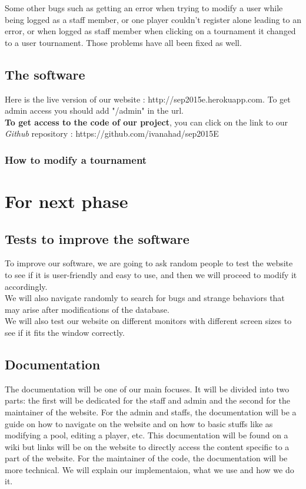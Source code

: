 \documentclass[a4paper, 12pt]{article}
\begin{document}
Some other bugs such as getting an error when trying to modify a user while being logged as a staff member, or one player couldn’t register alone leading to an error, or when logged as staff member when clicking on a tournament it changed to a user tournament. Those problems have all been fixed as well.

\subsection{The software}


Here is the live version of our website : http://sep2015e.herokuapp.com.  To get admin access you should add "/admin" in the url.\\

\textbf{To get access to the code of our project}, you can click on the link to our \textit{Github} repository : https://github.com/ivanahad/sep2015E\\
\subsubsection*{How to modify a tournament}

\section{For next phase}
\subsection{Tests to improve the software}
To improve our software, we are going to ask random people to test the website to see if it is user-friendly and easy to use, and then we will proceed to modify it accordingly.\\

We will also navigate randomly to search for bugs and strange behaviors that may arise after modifications of the database.\\
 
We will also test our website on different monitors with different screen sizes to see if it fits the window correctly.\\

\subsection{Documentation}
The documentation will be one of our main focuses. It will be divided into two parts: the first will be dedicated for the staff and admin and the second for the maintainer of the website. For the admin and staffs, the documentation will be a guide on how to navigate on the website and on how to basic stuffs like as modifying a pool, editing a player, etc. This documentation will be found on a wiki but links will be on the website to directly access the content specific to a part of the website. For the maintainer of the code, the documentation will be more technical. We will explain our implementaion, what we use and how we do it. 
\end{document}
